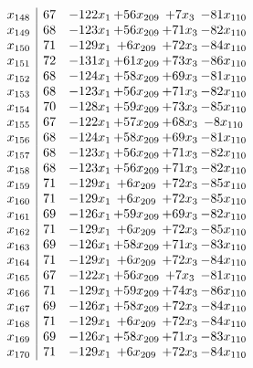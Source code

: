 \documentclass[11pt]{article}
\begin{document}
\[\begin{array}{c| c c@{\hskip 2pt} c@{\hskip 2pt} c@{\hskip 2pt} c@{\hskip 2pt} }
 x_{148}   &  67 & -122 x_{1} & + 56 x_{209} & + 7 x_{3} & -81 x_{110}\\
 x_{149}   &  68 & -123 x_{1} & + 56 x_{209} & + 71 x_{3} & -82 x_{110}\\
 x_{150}   &  71 & -129 x_{1} & + 6 x_{209} & + 72 x_{3} & -84 x_{110}\\
 x_{151}   &  72 & -131 x_{1} & + 61 x_{209} & + 73 x_{3} & -86 x_{110}\\
 x_{152}   &  68 & -124 x_{1} & + 58 x_{209} & + 69 x_{3} & -81 x_{110}\\
 x_{153}   &  68 & -123 x_{1} & + 56 x_{209} & + 71 x_{3} & -82 x_{110}\\
 x_{154}   &  70 & -128 x_{1} & + 59 x_{209} & + 73 x_{3} & -85 x_{110}\\
 x_{155}   &  67 & -122 x_{1} & + 57 x_{209} & + 68 x_{3} & -8 x_{110}\\
 x_{156}   &  68 & -124 x_{1} & + 58 x_{209} & + 69 x_{3} & -81 x_{110}\\
 x_{157}   &  68 & -123 x_{1} & + 56 x_{209} & + 71 x_{3} & -82 x_{110}\\
 x_{158}   &  68 & -123 x_{1} & + 56 x_{209} & + 71 x_{3} & -82 x_{110}\\
 x_{159}   &  71 & -129 x_{1} & + 6 x_{209} & + 72 x_{3} & -85 x_{110}\\
 x_{160}   &  71 & -129 x_{1} & + 6 x_{209} & + 72 x_{3} & -85 x_{110}\\
 x_{161}   &  69 & -126 x_{1} & + 59 x_{209} & + 69 x_{3} & -82 x_{110}\\
 x_{162}   &  71 & -129 x_{1} & + 6 x_{209} & + 72 x_{3} & -85 x_{110}\\
 x_{163}   &  69 & -126 x_{1} & + 58 x_{209} & + 71 x_{3} & -83 x_{110}\\
 x_{164}   &  71 & -129 x_{1} & + 6 x_{209} & + 72 x_{3} & -84 x_{110}\\
 x_{165}   &  67 & -122 x_{1} & + 56 x_{209} & + 7 x_{3} & -81 x_{110}\\
 x_{166}   &  71 & -129 x_{1} & + 59 x_{209} & + 74 x_{3} & -86 x_{110}\\
 x_{167}   &  69 & -126 x_{1} & + 58 x_{209} & + 72 x_{3} & -84 x_{110}\\
 x_{168}   &  71 & -129 x_{1} & + 6 x_{209} & + 72 x_{3} & -84 x_{110}\\
 x_{169}   &  69 & -126 x_{1} & + 58 x_{209} & + 71 x_{3} & -83 x_{110}\\
 x_{170}   &  71 & -129 x_{1} & + 6 x_{209} & + 72 x_{3} & -84 x_{110}\\

\end{array}\]
\end{document}
